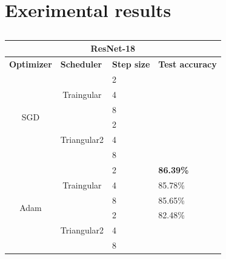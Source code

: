 \newpage
\appendix
\section{Exerimental results}


\begin{table}[ht!]
\centering
\caption{}
\label{tab:my-table}
\begin{tabular}{|ccll|}
\hline
\multicolumn{4}{|c|}{\textbf{ResNet-18}}                                          \\ \hline
\multicolumn{1}{|l|}{\textbf{Optimizer}}    & \multicolumn{1}{l|}{\textbf{Scheduler}}           & \multicolumn{1}{l|}{\textbf{Step size}} & \textbf{Test accuracy} \\ \hline
\multicolumn{1}{|c|}{\multirow{6}{*}{SGD}}  & \multicolumn{1}{c|}{\multirow{3}{*}{Traingular}}  & \multicolumn{1}{l|}{2}                  &                        \\ \cline{3-4} 
\multicolumn{1}{|c|}{} & \multicolumn{1}{c|}{} & \multicolumn{1}{l|}{4} &         \\ \cline{3-4} 
\multicolumn{1}{|c|}{} & \multicolumn{1}{c|}{} & \multicolumn{1}{l|}{8} &         \\ \cline{2-4} 
\multicolumn{1}{|c|}{}                      & \multicolumn{1}{c|}{\multirow{3}{*}{Triangular2}} & \multicolumn{1}{l|}{2}                  &                        \\ \cline{3-4} 
\multicolumn{1}{|c|}{} & \multicolumn{1}{c|}{} & \multicolumn{1}{l|}{4} &         \\ \cline{3-4} 
\multicolumn{1}{|c|}{} & \multicolumn{1}{c|}{} & \multicolumn{1}{l|}{8} &         \\ \hline
\multicolumn{1}{|c|}{\multirow{6}{*}{Adam}} & \multicolumn{1}{c|}{\multirow{3}{*}{Traingular}}  & \multicolumn{1}{l|}{2}                  & \textbf{86.39\%}       \\ \cline{3-4} 
\multicolumn{1}{|c|}{} & \multicolumn{1}{c|}{} & \multicolumn{1}{l|}{4} & 85.78\% \\ \cline{3-4} 
\multicolumn{1}{|c|}{} & \multicolumn{1}{c|}{} & \multicolumn{1}{l|}{8} & 85.65\% \\ \cline{2-4} 
\multicolumn{1}{|c|}{}                      & \multicolumn{1}{c|}{\multirow{3}{*}{Triangular2}} & \multicolumn{1}{l|}{2}                  & 82.48\%                \\ \cline{3-4} 
\multicolumn{1}{|c|}{} & \multicolumn{1}{c|}{} & \multicolumn{1}{l|}{4} &         \\ \cline{3-4} 
\multicolumn{1}{|c|}{} & \multicolumn{1}{c|}{} & \multicolumn{1}{l|}{8} &         \\ \hline
\end{tabular}
\end{table}




